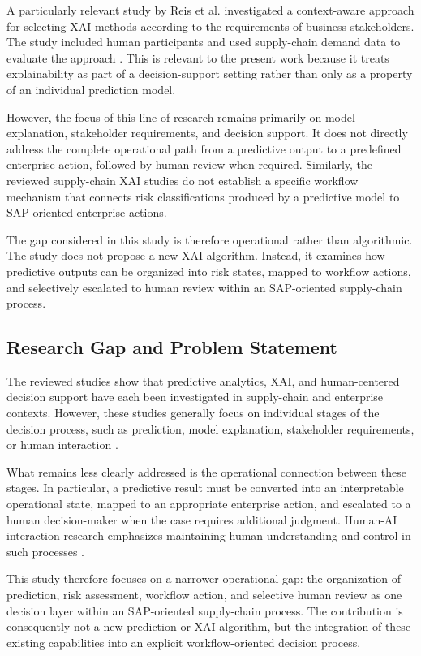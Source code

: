 \documentclass[10pt,a4paper]{article}
\begin{document}
A particularly relevant study by Reis et al. investigated a
context-aware approach for selecting XAI methods according to the
requirements of business stakeholders. The study included human
participants and used supply-chain demand data to evaluate the
approach \cite{reis2025contextxai}. This is relevant to the present
work because it treats explainability as part of a decision-support
setting rather than only as a property of an individual prediction
model.

However, the focus of this line of research remains primarily on
model explanation, stakeholder requirements, and decision support.
It does not directly address the complete operational path from a
predictive output to a predefined enterprise action, followed by
human review when required. Similarly, the reviewed supply-chain XAI
studies do not establish a specific workflow mechanism that connects
risk classifications produced by a predictive model to SAP-oriented
enterprise actions.

The gap considered in this study is therefore operational rather than
algorithmic. The study does not propose a new XAI algorithm. Instead,
it examines how predictive outputs can be organized into risk states,
mapped to workflow actions, and selectively escalated to human
review within an SAP-oriented supply-chain process.
\subsection{Research Gap and Problem Statement}

The reviewed studies show that predictive analytics, XAI, and human-centered decision support have each been investigated in supply-chain and enterprise contexts. However, these studies generally focus on individual stages of the decision process, such as prediction, model explanation, stakeholder requirements, or human interaction \cite{kostopoulos2024xai_dss,fanfani2026human_dss,olan2024xai_supplychain,kosasih2024xai_supplychain,reis2025contextxai}.

What remains less clearly addressed is the operational connection between these stages. In particular, a predictive result must be converted into an interpretable operational state, mapped to an appropriate enterprise action, and escalated to a human decision-maker when the case requires additional judgment. Human-AI interaction research emphasizes maintaining human understanding and control in such processes \cite{amershi2019guidelines}.

This study therefore focuses on a narrower operational gap: the organization of prediction, risk assessment, workflow action, and selective human review as one decision layer within an SAP-oriented supply-chain process. The contribution is consequently not a new prediction or XAI algorithm, but the integration of these existing capabilities into an explicit workflow-oriented decision process.
\end{document}
